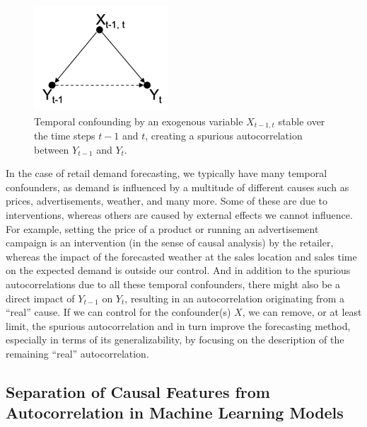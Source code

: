 \documentclass[BCOR=1mm, DIV=calc,10pt,
twoside=true,
twocolumn,
headings=normal]{scrartcl}
\begin{document}
\begin{figure}
\begin{center}
\includegraphics[width=5cm]{figs/temporal_confounding}
\caption{\label{fig:temporal_confounding} Temporal confounding by an exogenous variable $X_{t-1, t}$ stable over the time steps $t-1$ and $t$, creating a spurious autocorrelation between $Y_{t-1}$ and $Y_t$.}
\end{center}
\end{figure}

In the case of retail demand forecasting, we typically have many temporal confounders, as demand is influenced by a multitude of different causes such as prices, advertisements, weather, and many more. Some of these are due to interventions, whereas others are caused by external effects we cannot influence. For example, setting the price of a product or running an advertisement campaign is an intervention (in the sense of causal analysis) by the retailer, whereas the impact of the forecasted weather at the sales location and sales time on the expected demand is outside our control. And in addition to the spurious autocorrelations due to all these temporal confounders, there might also be a direct impact of $Y_{t-1}$ on $Y_t$, resulting in an autocorrelation originating from a ``real'' cause. If we can control for the confounder(s) $X$, we can remove, or at least limit, the spurious autocorrelation and in turn improve the forecasting method, especially in terms of its generalizability, by focusing on the description of the remaining ``real'' autocorrelation.

\subsection{Separation of Causal Features from Autocorrelation in Machine Learning Models}
\end{document}
